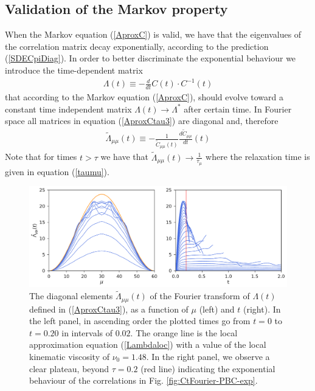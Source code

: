 \documentclass[b5paper,openright,10pt]{book}
\newcommand{\esc}{\!\cdot\!}
\begin{document}
\subsection{Validation of the Markov property}
\label{Sec:ValidateMarkovPBC}
When the  Markov equation (\ref{AproxC})  is valid, we have  that the
eigenvalues of  the correlation matrix decay  exponentially, according
to the prediction (\ref{SDECpiDiag}).  In order to better discriminate
the exponential behaviour we introduce the time-dependent matrix
\begin{align}
\Lambda(t)\equiv-    \frac{d}{dt}C(t)\esc C^{-1}(t)
\label{AproxCtau3}
\end{align}
that according  to the Markov equation  (\ref{AproxC}), should evolve
toward a constant time  independent matrix $ \Lambda(t)\to \Lambda^*$
after   certain  time.   In  Fourier   space  all   matrices  in   equation
(\ref{AproxCtau3}) are diagonal and, therefore
\begin{align}
\tilde{\Lambda}_{\mu\mu}(t)\equiv -    \frac{1}{\tilde{C}_{\mu\mu}(t)}\frac{d\tilde{C}_{\mu\mu}}{dt}(t)
\label{AproxCtau2}
\end{align}
Note that for times $t>\tau$ we have that $\tilde{\Lambda}_{\mu\mu}(t)\to \frac{1}{\tau_\mu}$
where the relaxation time is given in equation (\ref{taumu}).
\begin{figure}[h!]
  \centering
\includegraphics[width=\linewidth]{LambdatFourier-PBC}
\caption[Diagonal elements  $\tilde{\Lambda}_{\mu\mu}(t)$ of  the Fourier transform of $\Lambda(t)$ for an unconfined fluid]{The  diagonal elements  $\tilde{\Lambda}_{\mu\mu}(t)$ of  the
  Fourier transform of $\Lambda(t)$ defined in (\ref{AproxCtau3}), as a
  function of  $\mu$ (left)  and $t$  (right).  In  the left  panel, in
  ascending  order the  plotted times  go  from $t=0$  to $t=0.20$  in
  intervals of $0.02$.  The orange line is the local approximation equation
  (\ref{Lambdaloc}) with a  value of the local  kinematic viscosity of
  $\nu_0=1.48$.   In the  right panel,  we observe  a clear  plateau,
  beyond  $\tau=0.2$ (red line) indicating  the  exponential  behaviour  of  the
  correlations in Fig. \ref{fig:CtFourier-PBC-exp}.}
\label{fig:LambdatFourier-PBC}
\end{figure}
\end{document}
